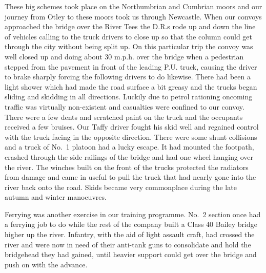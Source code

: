 These big schemes took place on the Northumbrian and Cumbrian moors
and our journey from Otley to these moors took us through Newcastle.
When our convoys approached the bridge over the River Tees the D.R.s
rode up and down the line of vehicles calling to the truck drivers to
close up so that the column could get through the city without being
split up. On this particular trip the convoy was well closed up and
doing about 30 m.p.h. over the bridge when a pedestrian stepped from
the pavement in front of the leading P.U. truck, causing the driver to
brake sharply forcing the following drivers to do likewise. There had
been a light shower which had made the road surface a bit greasy and
the trucks began sliding and skidding in all directions. Luckily due
to petrol rationing oncoming traffic was virtually non-existent and
casualties were confined to our convoy. There were a few dents and
scratched paint on the truck and the occupants received a few bruises.
Our Taffy driver fought his skid well and regained control with the
truck facing in the opposite direction. There were some shunt
collisions and a truck of No.~1 platoon had a lucky escape. It had
mounted the footpath, crashed through the side railings of the bridge
and had one wheel hanging over the river. The winches built on the
front of the trucks protected the radiators from damage and came in
useful to pull the truck that had nearly gone into the river back onto
the road. Skids became very commonplace during the late autumn and
winter manoeuvres.

Ferrying was another exercise in our training programme. No.~2
section once had a ferrying job to do while the rest of the company
built a Class 40 Bailey bridge higher up the river. Infantry, with
the aid of light assault craft, had crossed the river and were now in
need of their anti-tank guns to consolidate and hold the bridgehead
they had gained, until heavier support could get over the bridge and
push on with the advance.

